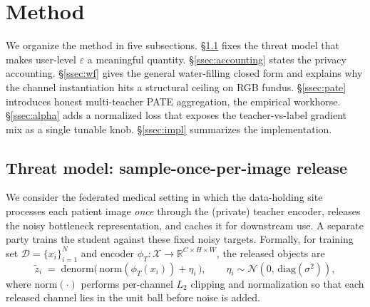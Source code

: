 %
%

\section{Method}
\label{sec:method}

We organize the method in five subsections. \S\ref{ssec:threat}
fixes the threat model that makes user-level $\varepsilon$ a meaningful
quantity. \S\ref{ssec:accounting} states the privacy accounting.
\S\ref{ssec:wf} gives the general water-filling closed form and
explains why the channel instantiation hits a structural ceiling on
RGB fundus. \S\ref{ssec:pate} introduces honest multi-teacher PATE
aggregation, the empirical workhorse. \S\ref{ssec:alpha} adds a
normalized loss that exposes the teacher-vs-label gradient mix as a
single tunable knob. \S\ref{ssec:impl} summarizes the implementation.

\subsection{Threat model: sample-once-per-image release}
\label{ssec:threat}

We consider the federated medical setting in which the data-holding
site processes each patient image \emph{once} through the (private)
teacher encoder, releases the noisy bottleneck representation, and
caches it for downstream use. A separate party trains the student
against these fixed noisy targets. Formally, for training set
$\mathcal{D}=\{x_i\}_{i=1}^{N}$ and encoder
$\phi_T : \mathcal{X}\!\to\!\mathbb{R}^{C\times H\times W}$, the
released objects are
\begin{equation}
\widetilde{z}_i \;=\; \mathrm{denorm}\!\bigl(\,\mathrm{norm}(\phi_T(x_i)) + \eta_i\,\bigr),
\qquad \eta_i \sim \mathcal{N}(0,\,\mathrm{diag}(\sigma^2)),
\label{eq:release}
\end{equation}
where $\mathrm{norm}(\cdot)$ performs per-channel $L_2$ clipping and
normalization so that each released channel lies in the unit ball
before noise is added.

